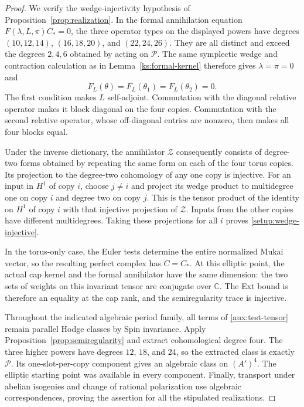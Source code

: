 \documentclass[11pt]{article}
\numberwithin{equation}{section}
\theoremstyle{definition}
\theoremstyle{remark}
\begin{document}
\begin{proof}
We verify the wedge-injectivity hypothesis of
Proposition~\ref{prop:realization}.  In the formal
annihilation equation $F(\lambda,L,\pi)C_*=0$, the
three operator types on the displayed powers have
degrees $(10,12,14)$, $(16,18,20)$, and $(22,24,26)$.
They are all distinct and exceed the degrees $2,4,6$
obtained by acting on $\mathcal P$.  The same symplectic
wedge and contraction calculation as in
Lemma~\ref{ks:formal-kernel} therefore gives
$\lambda=\pi=0$ and
\[
 F_L(\theta)=F_L(\theta_1)=F_L(\theta_2)=0.
\]
The first condition makes $L$ self-adjoint.  Commutation
with the diagonal relative operator makes it block
diagonal on the four copies.  Commutation with the
second relative operator, whose off-diagonal entries
are nonzero, then makes all four blocks equal.

Under the inverse dictionary, the annihilator
$\mathcal Z$ consequently consists of degree-two forms
obtained by repeating the same form on each of the
four torus copies.  Its projection to the degree-two
cohomology of any one copy is injective.  For an input
in $H^1$ of copy $i$, choose $j\ne i$ and project its
wedge product to multidegree one on copy $i$ and
degree two on copy $j$.  This is the tensor product
of the identity on $H^1$ of copy $i$ with that
injective projection of $\mathcal Z$.  Inputs from
the other copies have different multidegrees.  Taking
these projections for all $i$ proves
\eqref{setup:wedge-injective}.

In the torus-only case, the Euler tests determine
the entire normalized Mukai vector, so the resulting
perfect complex has $C=C_*$.  At this elliptic point,
the actual cap kernel and the formal annihilator
have the same dimension: the two sets of weights
on this invariant tensor are conjugate over $\mathbb C$.
The Ext bound is therefore an equality at the cap
rank, and the semiregularity trace is injective.

Throughout the indicated algebraic period family,
all terms of \eqref{aux:test-tensor} remain parallel
Hodge classes by Spin invariance.  Apply
Proposition~\ref{prop:semiregularity} and extract
cohomological degree four.  The three higher powers
have degrees $12$, $18$, and $24$, so the extracted
class is exactly $\mathcal P$.  Its one-slot-per-copy
component gives an algebraic class on $(A')^4$.
The elliptic starting point was available in every
component.  Finally, transport under abelian
isogenies and change of rational polarization use
algebraic correspondences, proving the assertion
for all the stipulated realizations.
\end{proof}
\end{document}
